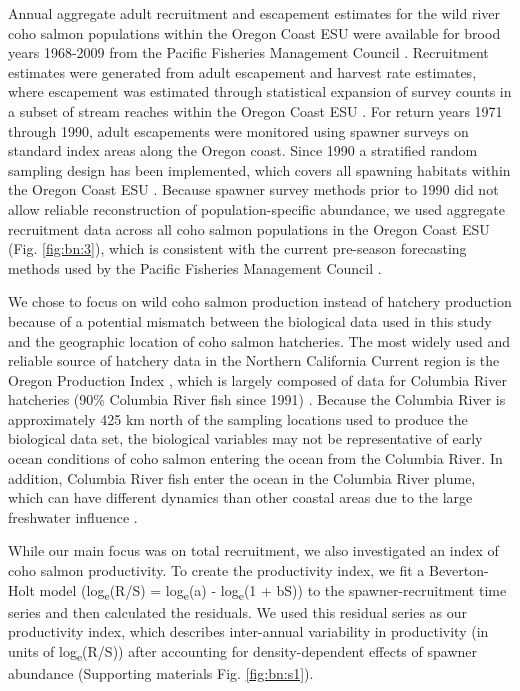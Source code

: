 Annual aggregate adult recruitment and escapement estimates for the wild river
coho salmon populations within the Oregon Coast ESU were available for brood
years 1968-2009 from the Pacific Fisheries Management Council \citep{PFMC2013,
Rupp2012}. Recruitment estimates were generated from adult escapement and
harvest rate estimates, where escapement was estimated through statistical
expansion of survey counts in a subset of stream reaches within the Oregon Coast
ESU \citep{Lewis2010}. For return years 1971 through 1990, adult escapements
were monitored using spawner surveys on standard index areas along the Oregon
coast. Since 1990 a stratified random sampling design has been implemented,
which covers all spawning habitats within the Oregon Coast ESU
\citep{Jacobs1998, Lewis2010}. Because spawner survey methods prior to 1990 did
not allow reliable reconstruction of population-specific abundance, we used
aggregate recruitment data across all coho salmon populations in the Oregon
Coast ESU (Fig. \ref{fig:bn:3}), which is consistent with the current pre-season
forecasting methods used by the Pacific Fisheries Management Council
\citep{PFMC2013}.

We chose to focus on wild coho salmon production instead of hatchery production
because of a potential mismatch between the biological data used in this study
and the geographic location of coho salmon hatcheries. The most widely used and
reliable source of hatchery data in the Northern California Current region is
the Oregon Production Index \citep{Logerwell2003a, Koslow2002a, Cole2000a},
which is largely composed of data for Columbia River hatcheries (90\% Columbia
River fish since 1991) \citep{PFMC2013}. Because the Columbia River is
approximately 425 km north of the sampling locations used to produce the
biological data set, the biological variables may not be representative of early
ocean conditions of coho salmon entering the ocean from the Columbia River. In
addition, Columbia River fish enter the ocean in the Columbia River plume, which
can have different dynamics than other coastal areas due to the large freshwater
influence \citep{Hickey1998}.

While our main focus was on total recruitment, we also investigated an index of
coho salmon productivity. To create the productivity index, we fit a
Beverton-Holt model (log\textsubscript{e}(R/S) = log\textsubscript{e}(a) -
log\textsubscript{e}(1 + bS)) \citep{Beverton1957a} to the spawner-recruitment
time series and then calculated the residuals. We used this residual series as
our productivity index, which describes inter-annual variability in productivity
(in units of log\textsubscript{e}(R/S)) after accounting for density-dependent
effects of spawner abundance (Supporting materials Fig. \ref{fig:bn:s1}).


